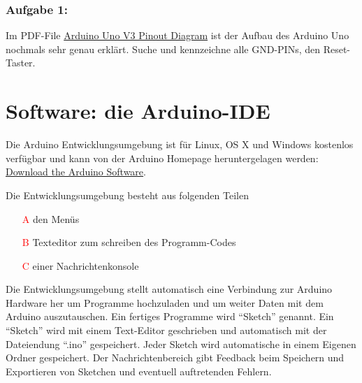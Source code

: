 \subsubsection{Aufgabe 1:} 
Im PDF-File \href{http://marcusjenkins.com/wp-content/uploads/2014/06/ARDUINO_V2.pdf}{Arduino Uno V3 Pinout Diagram} ist der Aufbau des Arduino Uno nochmals sehr genau erklärt. Suche und kennzeichne alle GND-PINs, den Reset-Taster.    


\section{Software: die Arduino-IDE}

Die Arduino Entwicklungsumgebung ist für Linux, OS X und Windows kostenlos verfügbar und kann von der Arduino Homepage heruntergelagen werden: \href{https://www.arduino.cc/en/Main/Software}{Download the Arduino Software}.

Die Entwicklungsumgebung besteht aus folgenden Teilen
\begin{itemize}
  \item[\textcolor{red}{A}]  den Menüs
  \item[\textcolor{red}{B}]  Texteditor zum schreiben des Programm-Codes
  \item[\textcolor{red}{C}]  einer Nachrichtenkonsole
\end{itemize}

Die Entwicklungsumgebung stellt automatisch eine Verbindung zur Arduino Hardware her um Programme hochzuladen und um weiter Daten mit dem Arduino auszutauschen. Ein fertiges Programme  wird ``Sketch'' genannt. Ein ``Sketch'' wird mit einem Text-Editor geschrieben und automatisch mit der Dateiendung ``.ino'' gespeichert. Jeder Sketch wird automatische in einem Eigenen Ordner gespeichert. Der Nachrichtenbereich gibt Feedback beim Speichern und Exportieren von Sketchen und eventuell auftretenden  Fehlern. 


